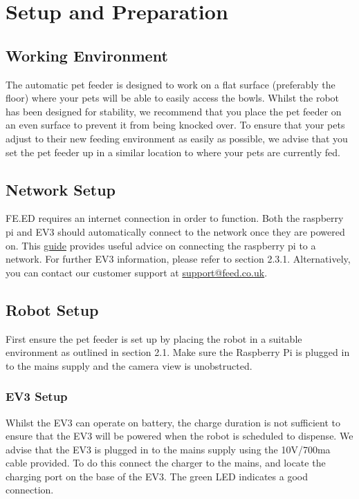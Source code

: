 \section{Setup and Preparation}
    \subsection{Working Environment}
    The automatic pet feeder is designed to work on a flat surface (preferably the floor) where your pets will be able to easily access the bowls. Whilst the robot has been designed for stability, we recommend that you place the pet feeder on an even surface to prevent it from being knocked over. To ensure that your pets adjust to their new feeding environment as easily as possible, we advise that you set the pet feeder up in a similar location to where your pets are currently fed. 
    
    \subsection{Network Setup}
    FE.ED requires an internet connection in order to function. Both the raspberry pi and EV3 should automatically connect to the network once they are powered on. This \href{https://cdn-learn.adafruit.com/downloads/pdf/adafruits-raspberry-pi-lesson-3-network-setup.pdf}{guide} provides useful advice on connecting the raspberry pi to a network. For further EV3 information, please refer to section 2.3.1. Alternatively, you can contact our customer support at \href{mailto:support@feed.co.uk}{support@feed.co.uk}.
    
    \subsection{Robot Setup}
    First ensure the pet feeder is set up by placing the robot in a suitable environment as outlined in section 2.1. Make sure the Raspberry Pi is plugged in to the mains supply and the camera view is unobstructed. 

    \subsubsection{EV3 Setup}
    Whilst the EV3 can operate on battery, the charge duration is not sufficient to ensure that the EV3 will be powered when the robot is scheduled to dispense. We advise that the EV3 is plugged in to the mains supply using the 10V/700ma cable provided. To do this connect the charger to the mains, and locate the charging port on the base of the EV3. The green LED indicates a good connection.
    
